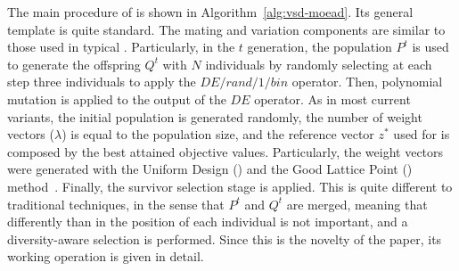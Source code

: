 The main procedure of \AVSDMOEAD{} is shown in Algorithm~\ref{alg:vsd-moead}.
%
Its general template is quite standard.
%
The mating and variation components are similar to those used in typical \MOEAS{}.
%
Particularly, in the $t$ generation, the population $P^t$ is used to generate
the offspring $Q^t$ with $N$ individuals by randomly selecting at each step three individuals
to apply the $DE/rand/1/bin$ operator.
%
Then, polynomial mutation is applied to the output of the $DE$ operator.
%
As in most current \MOEAD{} variants, the initial population is generated randomly,
the number of weight vectors ($\lambda$) is equal to the population size,
and the reference vector $z^*$ used for \ASF{} is composed by the best attained 
objective values.
%
Particularly, the weight vectors were generated
with the Uniform Design (\UD{}) and the Good Lattice Point (\GLP{}) method~\cite{tan2013moea1, tan2013moea2}.
%
Finally, the survivor selection stage is applied.
%
This is quite different to traditional techniques, in the sense that $P^t$ and $Q^t$ are merged, meaning
that differently than in \MOEAD{} the position of each individual is not important, and a diversity-aware
selection is performed.
%
Since this is the novelty of the paper, its working operation is given in detail.

